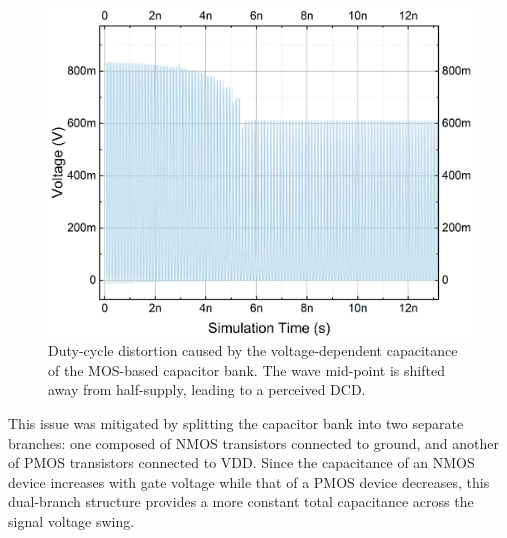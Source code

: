 \begin{figure}[H]
  \centering
  \includegraphics[width=0.8\linewidth]{figures/Results/FF_8out_PPNN-DCDWithCap.png}
  \caption{Duty-cycle distortion caused by the voltage-dependent capacitance of the MOS-based capacitor bank. The wave mid-point is shifted away from half-supply, leading to a perceived DCD.}
  \label{fig:FF_CapDCD}
\end{figure}

This issue was mitigated by splitting the capacitor bank into two separate branches: one composed of NMOS transistors connected to ground, and another of PMOS transistors connected to VDD. Since the capacitance of an NMOS device increases with gate voltage while that of a PMOS device decreases, this dual-branch structure provides a more constant total capacitance across the signal voltage swing.

